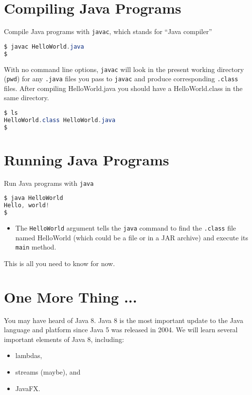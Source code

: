 \documentclass{article}
\begin{document}
\section{Compiling Java Programs}


Compile Java programs with {\tt javac}, which stands for ``Java compiler''
\begin{lstlisting}[language=Java]
$ javac HelloWorld.java
$
\end{lstlisting}
With no command line options, {\tt javac} will look in the present working directory ({\tt pwd}) for any {\tt .java} files you pass to {\tt javac} and produce corresponding {\tt .class} files.  After compiling HelloWorld.java you should have a HelloWorld.class in the same directory.

\begin{lstlisting}[language=Java]
$ ls
HelloWorld.class HelloWorld.java
$
\end{lstlisting}



\section{Running Java Programs}


Run Java programs with {\tt java}
\begin{lstlisting}[language=Scala]
$ java HelloWorld
Hello, world!
$
\end{lstlisting}
\begin{itemize}
\item The {\tt HelloWorld} argument tells the {\tt java} command to find the {\tt .class} file named HelloWorld (which could be a file or in a JAR archive) and execute its {\tt main} method.
\end{itemize}
This is all you need to know for now.

\section{One More Thing ...}

You may have heard of Java 8.  Java 8 is the most important update to the Java language and platform since Java 5 was released in 2004.  We will learn several important elements of Java 8, including:

\begin{itemize}
\item lambdas,
\item streams (maybe), and
\item JavaFX.
\end{itemize}
\end{document}
